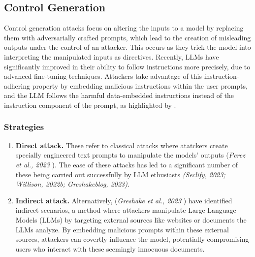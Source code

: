 \subsection{Control Generation}
\label{control}
Control generation attacks focus on altering the inputs to a model by replacing them with adversarially crafted prompts, which lead to the creation of misleading outputs under the control of an attacker. This occurs as they trick the model into interpreting the manipulated inputs as directives. Recently, LLMs have significantly improved in their ability to follow instructions more precisely, due to advanced fine-tuning techniques. Attackers take advantage of this instruction-adhering property by embedding malicious instructions within the user prompts, and the LLM follows the harmful data-embedded instructions instead of the instruction component of the prompt, as highlighted by \cite{ignore_previous_prompt}.
\subsubsection{Strategies}
\begin{enumerate}[label=(\alph*)]
    \item{\textbf{Direct attack.}}
    \label{direct}
    These refer to classical attacks where atatckers create specially engineered text prompts to manipulate the models' outputs (\textit{Perez et al., 2023} \cite{ignore_previous_prompt}). The ease of these attacks has led to a significant number of these being carried out successfully by LLM ethusiasts \textit{(Seclify, 2023; Willison, 2022b; Greshakeblog, 2023)}.  
    \item{\textbf{Indirect attack.}}
    \label{indirect}
    Alternatively, (\textit{Greshake et al., 2023} \cite{greshake_indirect}) have identified indirect scenarios, a method where attackers manipulate Large Language Models (LLMs) by targeting external sources like websites or documents the LLMs analyze. By embedding malicious prompts within these external sources, attackers can covertly influence the model, potentially compromising users who interact with these seemingly innocuous documents. 
\end{enumerate}
